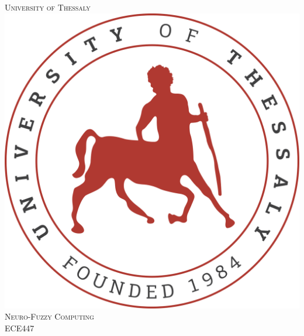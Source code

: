 \documentclass[a4paper,12pt]{article}
\begin{document}
	
	\begin{titlepage}
		\thispagestyle{first}
		
		\newcommand{\HRule}{\rule{\linewidth}{0.5mm}} %
		
		\center %
		
		
		\textsc{\LARGE University of Thessaly}\\[1.6cm] %
		\includegraphics[scale=.5]{Images/uth-logo.png}\\[1cm] %
		\textsc{\Large Neuro-Fuzzy Computing}\\[0.6cm] %
		\textsc{\large ECE447}\\[0.5cm] %
		
		

\end{titlepage}
\end{document}
